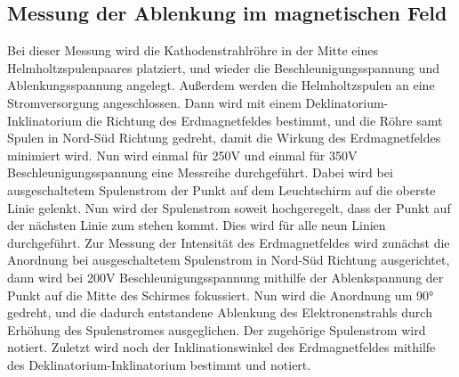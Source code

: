 \subsection{Messung der Ablenkung im magnetischen Feld}
Bei dieser Messung wird die Kathodenstrahlröhre in der Mitte eines Helmholtzspulenpaares platziert, und wieder die Beschleunigungsspannung und Ablenkungsspannung
angelegt. Außerdem werden die Helmholtzspulen an eine Stromversorgung angeschlossen. Dann wird mit einem Deklinatorium-Inklinatorium die Richtung des Erdmagnetfeldes
bestimmt, und die Röhre samt Spulen in Nord-Süd Richtung gedreht, damit die Wirkung des Erdmagnetfeldes minimiert wird.
Nun wird einmal für 250V und einmal für 350V Beschleunigungsspannung eine Messreihe durchgeführt. Dabei wird bei ausgeschaltetem Spulenstrom der Punkt auf dem
Leuchtschirm auf die oberste Linie gelenkt. Nun wird der Spulenstrom soweit hochgeregelt, dass der Punkt auf der nächsten Linie zum stehen kommt. Dies wird für alle
neun Linien durchgeführt. Zur Messung der Intensität des Erdmagnetfeldes wird zunächst die Anordnung bei ausgeschaltetem Spulenstrom in Nord-Süd Richtung ausgerichtet,
dann wird bei 200V Beschleunigungsspannung mithilfe der Ablenkspannung der Punkt auf die Mitte des Schirmes fokussiert. Nun wird die Anordnung um 90° gedreht, und die
dadurch entstandene Ablenkung des Elektronenstrahls durch Erhöhung des Spulenstromes ausgeglichen. Der zugehörige Spulenstrom wird notiert. Zuletzt wird noch der
Inklinationswinkel des Erdmagnetfeldes mithilfe des Deklinatorium-Inklinatorium bestimmt und notiert. 
